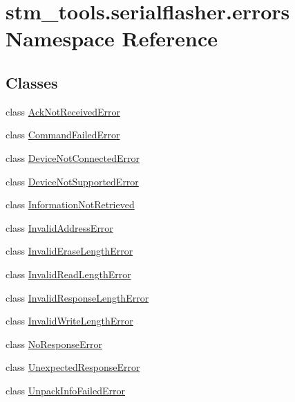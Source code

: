\hypertarget{namespacestm__tools_1_1serialflasher_1_1errors}{}\section{stm\+\_\+tools.\+serialflasher.\+errors Namespace Reference}
\label{namespacestm__tools_1_1serialflasher_1_1errors}
\subsection*{Classes}
\begin{DoxyCompactItemize}
\item 
class \hyperlink{classstm__tools_1_1serialflasher_1_1errors_1_1AckNotReceivedError}{Ack\+Not\+Received\+Error}
\item 
class \hyperlink{classstm__tools_1_1serialflasher_1_1errors_1_1CommandFailedError}{Command\+Failed\+Error}
\item 
class \hyperlink{classstm__tools_1_1serialflasher_1_1errors_1_1DeviceNotConnectedError}{Device\+Not\+Connected\+Error}
\item 
class \hyperlink{classstm__tools_1_1serialflasher_1_1errors_1_1DeviceNotSupportedError}{Device\+Not\+Supported\+Error}
\item 
class \hyperlink{classstm__tools_1_1serialflasher_1_1errors_1_1InformationNotRetrieved}{Information\+Not\+Retrieved}
\item 
class \hyperlink{classstm__tools_1_1serialflasher_1_1errors_1_1InvalidAddressError}{Invalid\+Address\+Error}
\item 
class \hyperlink{classstm__tools_1_1serialflasher_1_1errors_1_1InvalidEraseLengthError}{Invalid\+Erase\+Length\+Error}
\item 
class \hyperlink{classstm__tools_1_1serialflasher_1_1errors_1_1InvalidReadLengthError}{Invalid\+Read\+Length\+Error}
\item 
class \hyperlink{classstm__tools_1_1serialflasher_1_1errors_1_1InvalidResponseLengthError}{Invalid\+Response\+Length\+Error}
\item 
class \hyperlink{classstm__tools_1_1serialflasher_1_1errors_1_1InvalidWriteLengthError}{Invalid\+Write\+Length\+Error}
\item 
class \hyperlink{classstm__tools_1_1serialflasher_1_1errors_1_1NoResponseError}{No\+Response\+Error}
\item 
class \hyperlink{classstm__tools_1_1serialflasher_1_1errors_1_1UnexpectedResponseError}{Unexpected\+Response\+Error}
\item 
class \hyperlink{classstm__tools_1_1serialflasher_1_1errors_1_1UnpackInfoFailedError}{Unpack\+Info\+Failed\+Error}
\end{DoxyCompactItemize}
